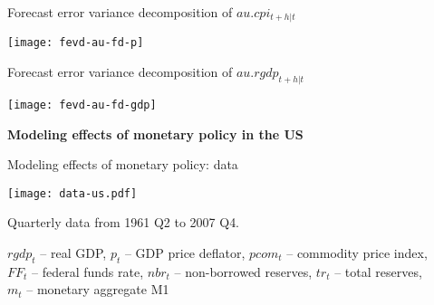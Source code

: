 \documentclass[notes,blackandwhite,mathsans,usenames,dvipsnames]{beamer}
\begin{document}
\begin{frame}{Forecast error variance decomposition of $au.cpi_{t+h|t}$}

\centering
\texttt{[image: fevd-au-fd-p]}

\end{frame}


\begin{frame}{Forecast error variance decomposition of $au.rgdp_{t+h|t}$}

\centering
\texttt{[image: fevd-au-fd-gdp]}

\end{frame}















{
\begin{frame}

\begin{center}
\vspace{1cm}\Large\textbf{\color{purple}Modeling effects of monetary policy in the US}%
\end{center}

\end{frame}
}


\begin{frame}{Modeling effects of monetary policy: {\color{purple}data}}

\centering\texttt{[image: data-us.pdf]}

\begin{center}
\small {\color{mcxs2}Quarterly data from 1961 Q2 to 2007 Q4.} 
\end{center}

\smallskip\scriptsize $  rgdp_t$ {\color{mcxs2}-- real GDP,} $  p_t$ {\color{mcxs2}-- GDP price deflator,} $  pcom_t$ {\color{mcxs2}-- commodity price index,}\\ $FF_t$ {\color{mcxs2}-- federal funds rate,} $  nbr_t$ {\color{mcxs2}-- non-borrowed reserves,} $  tr_t$ {\color{mcxs2}-- total reserves,}\\  $  m_t$ {\color{mcxs2}-- monetary aggregate M1}

\end{frame}
\end{document}
